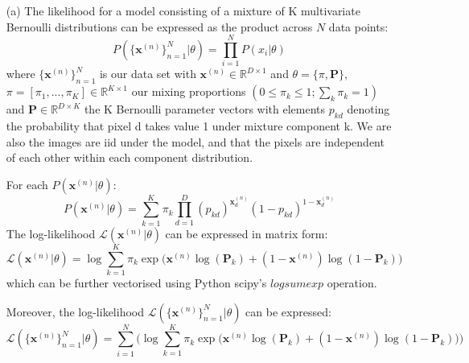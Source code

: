 \documentclass[12pt]{article}
\begin{document}
\begin{enumerate}

%
%

\item[(a)] The likelihood for a model consisting of a mixture of K multivariate Bernoulli distributions can be expressed as the product across $N$ data points:
$$P(\{\textbf{x}^{(n)}\}_{n=1}^{N}|\theta) = \prod_{i=1}^{N}P(x_i|\theta)$$
where $\{\textbf{x}^{(n)}\}_{n=1}^{N}$ is our data set with $\textbf{x}^{(n)} \in \mathbb{R}^{D \times 1}$ and $\theta = \{\pi, \mathbf{P}\}$, $\pi = [\pi_1, . . . , \pi_K] \in \mathbb{R}^{K \times 1}$ our mixing proportions $(0 \leq \pi_k \leq 1; \sum_k \pi_k = 1)$ and $\mathbf{P} \in \mathbb{R}^{D \times K}$ the K Bernoulli parameter vectors with elements $p_{kd}$ denoting the probability that pixel d takes value 1 under mixture component k. We are also the images are iid under the model, and that the pixels are independent of each other within each component distribution.

For each $P(\textbf{x}^{(n)}|\theta)$:
$$P(\textbf{x}^{(n)}|\theta) = \sum_{k=1}^{K} \pi_k \prod_{d=1}^D (p_{kd})^{\textbf{x}^{(n)}_{d}} (1-p_{kd})^{1-\textbf{x}^{(n)}_{d}}$$
The log-likelihood $\mathcal{L}(\textbf{x}^{(n)}|\theta)$ can be expressed in matrix form:
$$\mathcal{L}(\textbf{x}^{(n)}|\theta) = \log \sum_{k=1}^{K}  \pi_k \exp\bigg(\textbf{x}^{(n)}\log(\mathbf{P}_{k}) + (1-\textbf{x}^{(n)})\log(1-\mathbf{P}_{k})\bigg) $$
which can be further vectorised using Python scipy's $logsumexp$ operation.

Moreover, the log-likelihood $\mathcal{L}(\{\textbf{x}^{(n)}\}_{n=1}^{N}|\theta)$ can be expressed:
$$\mathcal{L}(\{\textbf{x}^{(n)}\}_{n=1}^{N}|\theta) = \sum_{i=1}^{N} \Bigg( \log \sum_{k=1}^{K}  \pi_k \exp\bigg(\textbf{x}^{(n)}\log(\mathbf{P}_{k}) + (1-\textbf{x}^{(n)})\log(1-\mathbf{P}_{k})\bigg) \Bigg)$$


\end{enumerate}
\end{document}
